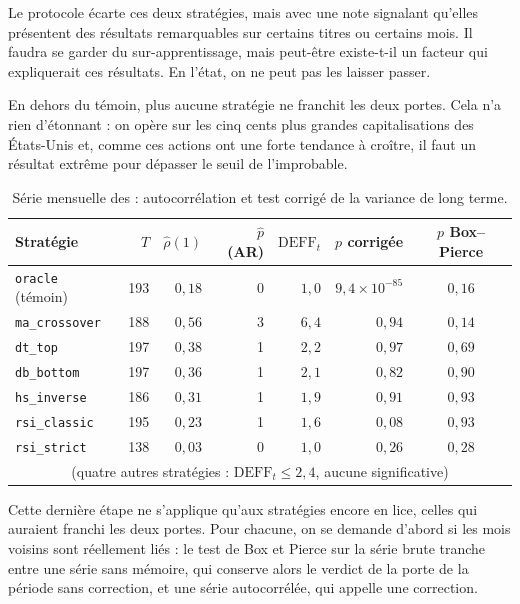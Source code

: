 Le protocole écarte ces deux stratégies, mais avec une note signalant qu'elles
présentent des résultats remarquables sur certains titres ou certains mois.
Il faudra se garder du sur-apprentissage, mais peut-être existe-t-il un
facteur qui expliquerait ces résultats. En l'état, on ne peut pas les laisser
passer.

En dehors du témoin, plus aucune stratégie ne franchit les deux portes. Cela
n'a rien d'étonnant : on opère sur les cinq cents plus grandes capitalisations
des États-Unis et, comme ces actions ont une forte tendance à croître, il faut
un résultat extrême pour dépasser le seuil de l'improbable.


\begin{table}[H]
\centering
\caption{Série mensuelle des \edgevar{} : autocorrélation et test corrigé de
la variance de long terme.}
\label{tab:b1-dep-mensuel}
\small
\begin{tabular}{@{}lrrrrrc@{}}
\toprule
Stratégie & $T$ & $\hat\rho(1)$ & $\hat p$ (AR) & $\mathrm{DEFF}_t$ & $p$ corrigée & $p$ Box--Pierce \\
\midrule
\texttt{oracle} (témoin) & 193 & $0{,}18$ & 0 & $1{,}0$ & $9{,}4\times10^{-85}$ & $0{,}16$ \\
\midrule
\texttt{ma\_crossover} & 188 & $0{,}56$ & 3 & $6{,}4$ & $0{,}94$ & $0{,}14$ \\
\texttt{dt\_top}       & 197 & $0{,}38$ & 1 & $2{,}2$ & $0{,}97$ & $0{,}69$ \\
\texttt{db\_bottom}    & 197 & $0{,}36$ & 1 & $2{,}1$ & $0{,}82$ & $0{,}90$ \\
\texttt{hs\_inverse}   & 186 & $0{,}31$ & 1 & $1{,}9$ & $0{,}91$ & $0{,}93$ \\
\texttt{rsi\_classic}  & 195 & $0{,}23$ & 1 & $1{,}6$ & $0{,}08$ & $0{,}93$ \\
\texttt{rsi\_strict}   & 138 & $0{,}03$ & 0 & $1{,}0$ & $0{,}26$ & $0{,}28$ \\
\multicolumn{7}{c}{\footnotesize (quatre autres stratégies : $\mathrm{DEFF}_t \le 2{,}4$, aucune significative)} \\
\bottomrule
\end{tabular}
\end{table}


Cette dernière étape ne s'applique qu'aux stratégies encore en lice, celles
qui auraient franchi les deux portes. Pour chacune, on se demande d'abord si
les mois voisins sont réellement liés : le test de Box et Pierce sur la série
brute tranche entre une série sans mémoire, qui conserve alors le verdict de
la porte de la période sans correction, et une série autocorrélée, qui appelle
une correction.

